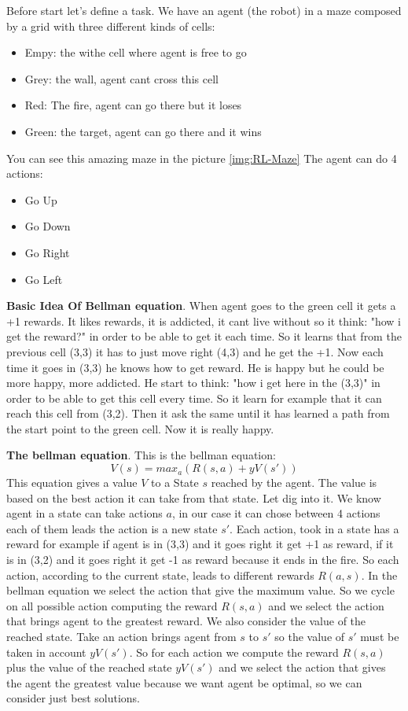 Before start let's define a task. We have an agent (the robot) in a maze composed by a grid with three different kinds of cells:
 \begin{itemize}
 \item Empy: the withe cell where agent is free to go
 \item Grey: the wall, agent cant cross this cell
 \item Red: The fire, agent can go there but it loses
 \item Green: the target, agent can go there and it wins
 \end{itemize}
 You can see this amazing maze in the picture \ref{img:RL-Maze}
 The agent can do 4 actions:
 \begin{itemize}
 \item Go Up
 \item Go Down
 \item Go Right
 \item Go Left
 \end{itemize}

\textbf{Basic Idea Of Bellman equation}. When agent goes to the green cell it gets a +1 rewards. It likes rewards, it is addicted, it cant live without so it think: "how i get the reward?" in order to be able to get it each time. So it learns that from the previous cell (3,3) it has to just move right (4,3) and he get the +1. Now each time it goes in (3,3) he knows how to get reward. He is happy but he could be more happy, more addicted. He start to think: "how i get here in the (3,3)" in order to be able to get this cell every time. So it learn for example that it can reach this cell from (3,2). Then it ask the same until it has learned a path from the start point to the green cell. Now it is really happy. 

\textbf{The bellman equation}. This is the bellman equation:
\begin{equation}
V(s) = max_a(R(s,a) + yV(s'))
\end{equation}
This equation gives a value $V$ to a State $s$ reached by the agent. The value is based on the best action it can take from that state. Let dig into it. We know agent in a state can take actions $a$, in our case it can chose between 4 actions each of them leads the action is a new state $s'$. Each action, took in a state has a reward for example if agent is in (3,3) and it goes right it get +1 as reward, if it is in (3,2) and it goes right it get -1 as reward because it ends in the fire. So each action, according to the current state, leads to different rewards $R(a,s)$. In the bellman equation we select the action that give the maximum value. So we cycle on all possible action computing the reward $R(s,a)$ and we select the action that brings agent to the greatest reward. We also consider the value of the reached state. Take an action brings agent from $s$ to $s'$ so the value of $s'$ must be taken in account $yV(s')$. So for each action we compute the reward $R(s,a)$ plus the value of the reached state $yV(s')$ and we select the action that gives the agent the greatest value because we want agent be optimal, so we can consider just best solutions.

